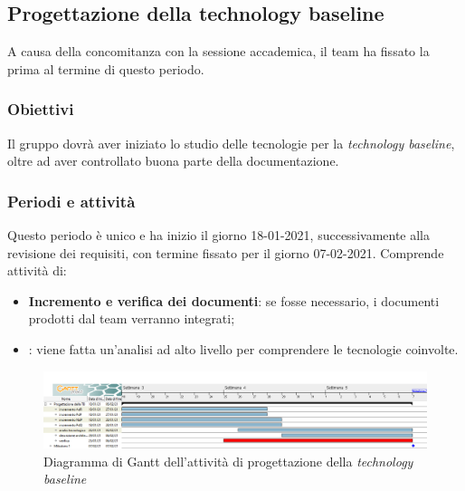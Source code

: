 \subsection{Progettazione della technology baseline}
A causa della concomitanza con la sessione accademica, il team ha fissato la prima  al termine di questo periodo. 
\subsubsection{Obiettivi}
Il gruppo dovrà aver iniziato lo studio delle tecnologie per la \textit{technology baseline}, oltre ad aver controllato buona parte della documentazione.
\subsubsection{Periodi e attività}
Questo periodo è unico e ha inizio il giorno 18-01-2021, successivamente alla revisione dei requisiti, con termine fissato per il giorno 07-02-2021. Comprende attività di: 
\begin{itemize}
\item \textbf{Incremento e verifica dei documenti}: se fosse necessario, i documenti prodotti dal team verranno integrati;
\item {}: viene fatta un'analisi ad alto livello per comprendere le tecnologie coinvolte.
\end{itemize}

\begin{figure}[h]
	\centering	
	\includegraphics[width=\linewidth]{Images/GanttPianificazioneProgettazioneTB.PNG}
	\caption{Diagramma di Gantt dell'attività di progettazione della \textit{technology baseline}}
\end{figure}